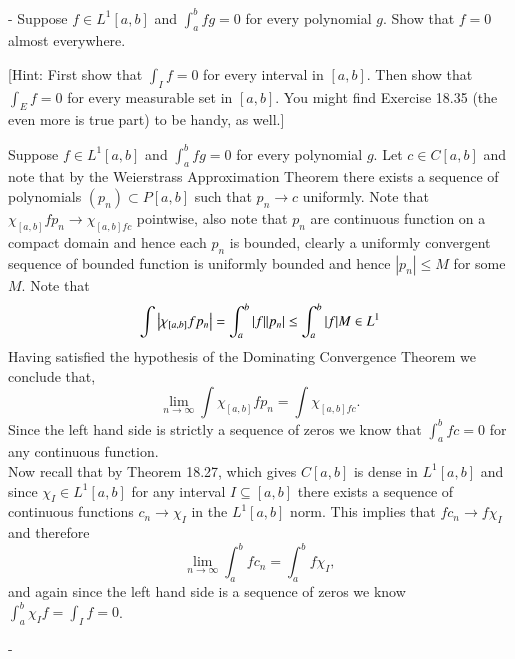 \documentclass[12pt]{article}
\makeatletter
\theoremstyle{ex215}
\newcounter{probcount}
\newlength\probsep
\newlength\pshrinking
\newenvironment{problems}%
  {\ifhmode\unskip\par\fi\setcounter{probcount}{0}\probsep\parskip
  \sbox\@tempboxa{\textbf{9.}}\pshrinking\wd\@tempboxa\advance\pshrinking\labelsep
  \advance\linewidth -\pshrinking
  \advance\@totalleftmargin\pshrinking
  \advance\leftskip\pshrinking}%
  {\ifhmode\unskip \par\fi\advance\leftskip-\pshrinking}%
\renewenvironment{proof}[1][\proofname]{\par
  \pushQED{\qed}%
  \normalfont \topsep6\p@\@plus6\p@\relax
  \trivlist
  \@topsep \topsep
  \item[\hskip\labelsep
        \itshape
    #1\@addpunct{.}]\ignorespaces
}{%
  \popQED\endtrivlist\@endpefalse
}
\makeatother
\begin{document}
\begin{problems}
Suppose $f\in L^1[a,b]$ and $\int_a^b fg=0$ for every polynomial $g$. Show that $f=0$ almost everywhere.

[Hint: First show that $\int_I f=0$ for every interval in $[a,b]$. Then show that $\int_Ef=0$ for every measurable set in $[a,b]$. You might find Exercise 18.35 (the even more is true part) to be handy, as well.]
\begin{proof} Suppose $f\in L^1[a,b]$ and $\int_a^b fg=0$ for every polynomial $g$. Let $c \in C[a, b]$ and note that by the Weierstrass Approximation Theorem there exists a sequence of polynomials $(p_n) \subset P[a, b]$ such that $p_n \to c$ uniformly. Note that $\chi_{[a, b]}fp_n \to \chi_{[a, b]fc}$ pointwise, also note that $p_n$ are continuous function on a compact domain and hence each $p_n$ is bounded, clearly a uniformly convergent sequence of bounded function is uniformly bounded and hence $|p_n| \leq M$ for some $M$. Note that
  \begin{equation*}
    \int \abs{\chi_{[a, b]}fp_n} = \int_a^b \abs{f}\abs{p_n} \leq \int_a^b \abs{f}M \in L^1
  \end{equation*}
  Having satisfied the hypothesis of the Dominating Convergence Theorem we conclude that, 
  \begin{equation*}
    \lim_{n \to \infty} \int \chi_{[a, b]}fp_n  = \int \chi_{[a, b]fc}.
  \end{equation*}
  Since the left hand side is strictly a sequence of zeros we know that $\int_a^b fc=0$ for any continuous function. \\

  Now recall that by Theorem 18.27, which gives $C[a, b]$ is dense in $L^1[a, b]$ and since $\chi_I \in L^1[a, b]$ for any interval $I \subseteq [a, b]$ there exists a sequence of continuous functions $c_n \to \chi_I$ in the $L^1[a, b]$ norm. This implies that $fc_n \to f\chi_I$ and therefore 
  \begin{equation*}
    \lim_{n \to \infty}\int_a^b fc_n = \int_a^b f\chi_I,
  \end{equation*}
  and again since the left hand side is a sequence of zeros we know $\int_a^b \chi_If = \int_I f = 0$.


\end{proof}
\end{problems}
\end{document}
